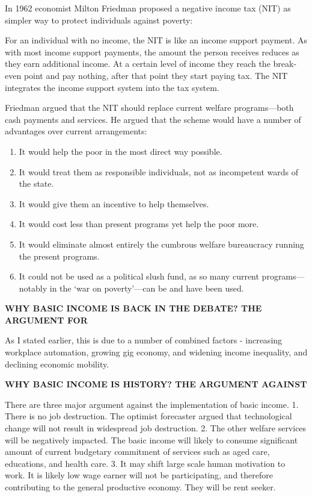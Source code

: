 \documentclass[11pt]{article}
\providecommand{\tightlist}{%
      \setlength{\itemsep}{0pt}\setlength{\parskip}{0pt}}
\begin{document}
In 1962 economist Milton Friedman proposed a negative income tax (NIT)
as simpler way to protect individuals against poverty:

For an individual with no income, the NIT is like an income support
payment. As with most income support payments, the amount the person
receives reduces as they earn additional income. At a certain level of
income they reach the break-even point and pay nothing, after that point
they start paying tax. The NIT integrates the income support system into
the tax system.

Friedman argued that the NIT should replace current welfare
programs---both cash payments and services. He argued that the scheme
would have a number of advantages over current arrangements:

\begin{enumerate}
\def\labelenumi{\arabic{enumi}.}
\tightlist
\item
  It would help the poor in the most direct way possible.
\item
  It would treat them as responsible individuals, not as incompetent
  wards of the state.
\item
  It would give them an incentive to help themselves.
\item
  It would cost less than present programs yet help the poor more.
\item
  It would eliminate almost entirely the cumbrous welfare bureaucracy
  running the present programs.
\item
  It could not be used as a political slush fund, as so many current
  programs---notably in the `war on poverty'---can be and have been
  used. 
\end{enumerate}

\textbf{WHY BASIC INCOME IS BACK IN THE DEBATE? THE ARGUMENT FOR}

As I stated earlier, this is due to a number of combined factors -
increasing workplace automation, growing gig economy, and widening
income inequality, and declining economic mobility.

\textbf{WHY BASIC INCOME IS HISTORY? THE ARGUMENT AGAINST}

There are three major argument against the implementation of basic
income. 1. There is no job destruction. The optimist forecaster argued
that technological change will not result in widespread job destruction.
2. The other welfare services will be negatively impacted. The basic
income will likely to consume significant amount of current budgetary
commitment of services such as aged care, educations, and health care.
3. It may shift large scale human motivation to work. It is likely low
wage earner will not be participating, and therefore contributing to the
general productive economy. They will be rent seeker.
\end{document}
